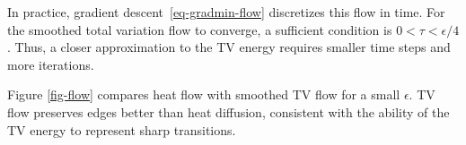 In practice, gradient descent~\eqref{eq-gradmin-flow} discretizes this flow in time. For the smoothed total variation flow to converge, a sufficient condition is $0<\tau<\epsilon/4$. Thus, a closer approximation to the TV energy requires smaller time steps and more iterations.

Figure \ref{fig-flow} compares heat flow with smoothed TV flow for a small $\epsilon$. TV flow preserves edges better than heat diffusion, consistent with the ability of the TV energy to represent sharp transitions.

                                                                                          

                                
                                                                         